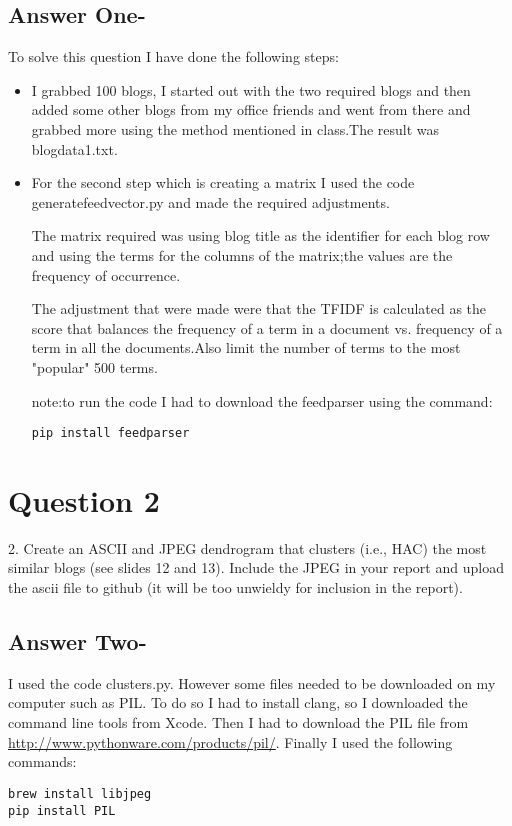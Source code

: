 \documentclass[letterpaper,11pt]{article}
\begin{document}
\subsection*{Answer One-}
To solve this question I have done the following steps:
\begin{itemize}
  \item I grabbed 100 blogs, I started out with the two required blogs and then added some other blogs from my office friends and went from there and grabbed more using the method mentioned in class.The result was blogdata1.txt.
  
  \item For the second step which is creating a matrix I used the code generatefeedvector.py and made the  required adjustments.

The matrix required was using blog title as the identifier for each blog row and using the terms for the columns of the matrix;the values are the frequency of occurrence.

The adjustment that were made were that the TFIDF is calculated as the score that balances the frequency of a term in a document vs. frequency of a term in all the documents.Also limit the number of terms to the most "popular" 500 terms.

note:to run the code I had to download the feedparser using the command:
\begin{lstlisting}[frame=single]
pip install feedparser
\end{lstlisting}

\end{itemize}
\newpage
\section*{Question 2}
2.  Create an ASCII and JPEG dendrogram that clusters (i.e., HAC) the most similar blogs (see slides 12 and 13).  Include the JPEG in your report and upload the ascii file to github (it will be too unwieldy for inclusion in the report).
\newpage
\subsection*{Answer Two-}
I used the code clusters.py. However some files needed to be downloaded on my computer such as PIL. To do so I had to install clang, so I downloaded the command line tools from Xcode. Then I had to download the PIL file from \url{http://www.pythonware.com/products/pil/}.
Finally I used the following commands:
\begin{lstlisting}[frame=single]
brew install libjpeg
pip install PIL
\end{lstlisting}
\end{document}
